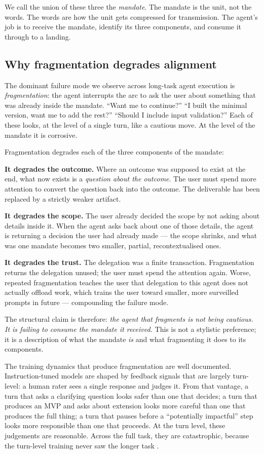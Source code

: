 \documentclass[11pt]{article}
\begin{document}
We call the union of these three the \emph{mandate}. The mandate is the
unit, not the words. The words are how the unit gets compressed for
transmission. The agent's job is to receive the mandate, identify its
three components, and consume it through to a landing.

\subsection{Why fragmentation degrades alignment}

The dominant failure mode we observe across long-task agent execution is
\emph{fragmentation}: the agent interrupts the arc to ask the user about
something that was already inside the mandate. ``Want me to continue?''
``I built the minimal version, want me to add the rest?'' ``Should I
include input validation?'' Each of these looks, at the level of a single
turn, like a cautious move. At the level of the mandate it is corrosive.

Fragmentation degrades each of the three components of the mandate:

\textbf{It degrades the outcome.} Where an outcome was supposed to exist at
the end, what now exists is a \emph{question about the outcome}. The user
must spend more attention to convert the question back into the outcome.
The deliverable has been replaced by a strictly weaker artifact.

\textbf{It degrades the scope.} The user already decided the scope by not
asking about details inside it. When the agent asks back about one of
those details, the agent is returning a decision the user had already
made --- the scope shrinks, and what was one mandate becomes two smaller,
partial, recontextualised ones.

\textbf{It degrades the trust.} The delegation was a finite transaction.
Fragmentation returns the delegation unused; the user must spend the
attention again. Worse, repeated fragmentation teaches the user that
delegation to this agent does not actually offload work, which trains
the user toward smaller, more surveilled prompts in future --- compounding
the failure mode.

The structural claim is therefore: \emph{the agent that fragments is not
being cautious. It is failing to consume the mandate it received.} This
is not a stylistic preference; it is a description of what the mandate
\emph{is} and what fragmenting it does to its components.

The training dynamics that produce fragmentation are well documented.
Instruction-tuned models are shaped by feedback signals that are largely
turn-level: a human rater sees a single response and judges it. From that
vantage, a turn that asks a clarifying question looks safer than one that
decides; a turn that produces an MVP and asks about extension looks more
careful than one that produces the full thing; a turn that pauses before a
``potentially impactful'' step looks more responsible than one that
proceeds. At the turn level, these judgements are reasonable. Across the
full task, they are catastrophic, because the turn-level training never saw
the longer task \citep{bai2022training,sharma2024towards}.
\end{document}
